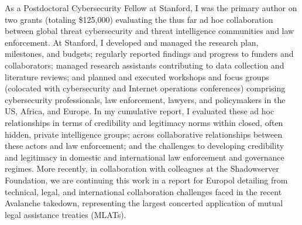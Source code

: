 \documentclass[11pt]{letter}
\begin{document}
\begin{letter}
As a Postdoctoral Cybersecurity Fellow at Stanford, I was the primary author on two grants (totaling \$125,000) evaluating the thus far ad hoc collaboration between global threat cybersecurity and threat intelligence communities and law enforcement.
%
%
At Stanford, I developed and managed the research plan, milestones, and budgets; regularly reported findings and progress to funders and collaborators; managed research assistants contributing to data collection and literature reviews; and planned and executed workshops and focus groups (colocated with cybersecurity and Internet operations conferences) comprising cybersecurity professionals, law enforcement, lawyers, and policymakers in the US, Africa, and Europe.
%
In my cumulative report, I evaluated these ad hoc relationships in terms of credibility and legitimacy norms within closed, often hidden, private intelligence groups; across collaborative relationships between these actors and law enforcement; and the challenges to developing credibility and legitimacy in domestic and international law enforcement and governance regimes.  
%
More recently, in collaboration with colleagues at the Shadowserver Foundation, we are continuing this work in a report for Europol detailing from technical, legal, and international collaboration challenges faced in the recent Avalanche takedown, representing the largest concerted application of mutual legal assistance treaties (MLATs).



\end{letter}
\end{document}
